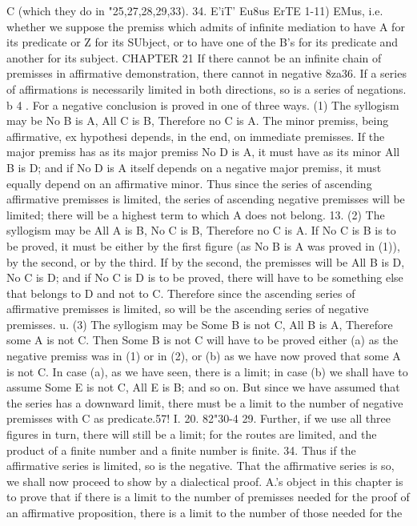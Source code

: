 {{{{{{{{{{{{{{{{{C (which they do in "25,27,28,29,33).
34. E'iT' Eu8us ErTE 1-11) EMus, i.e. whether we suppose the
premiss which admits of infinite mediation to have A for its
predicate or Z for its SUbject, or to have one of the B's for its
predicate and another for its subject.
CHAPTER 21
If there cannot be an infinite chain of premisses in affirmative
demonstration, there cannot in negative
8za36. If a series of affirmations is necessarily limited in both
directions, so is a series of negations.
b 4 . For a negative conclusion is proved in one of three ways.
(1) The syllogism may be No B is A, All C is B, Therefore no
C is A. The minor premiss, being affirmative, ex hypothesi
depends, in the end, on immediate premisses. If the major
premiss has as its major premiss No D is A, it must have as its
minor All B is D; and if No D is A itself depends on a negative
major premiss, it must equally depend on an affirmative minor.
Thus since the series of ascending affirmative premisses is limited,
the series of ascending negative premisses will be limited; there
will be a highest term to which A does not belong.
13. (2) The syllogism may be All A is B, No C is B, Therefore
no C is A. If No C is B is to be proved, it must be either by the
first figure (as No B is A was proved in (1)), by the second, or by
the third. If by the second, the premisses will be All B is D,
No C is D; and if No C is D is to be proved, there will have to
be something else that belongs to D and not to C. Therefore
since the ascending series of affirmative premisses is limited, so
will be the ascending series of negative premisses.
u. (3) The syllogism may be Some B is not C, All B is A,
Therefore some A is not C. Then Some B is not C will have to be
proved either (a) as the negative premiss was in (1) or in (2), or (b)
as we have now proved that some A is not C. In case (a), as we
have seen, there is a limit; in case (b) we shall have to assume
Some E is not C, All E is B; and so on. But since we have assumed
that the series has a downward limit, there must be a limit to
the number of negative premisses with C as predicate.57!
I. 20. 82"30-4
29. Further, if we use all three figures in turn, there will still
be a limit; for the routes are limited, and the product of a finite
number and a finite number is finite.
34. Thus if the affirmative series is limited, so is the negative.
That the affirmative series is so, we shall now proceed to show by
a dialectical proof.
A.'s object in this chapter is to prove that if there is a limit to
the number of premisses needed for the proof of an affirmative
proposition, there is a limit to the number of those needed for the
}}}}}}}}}}}}}}}}}
